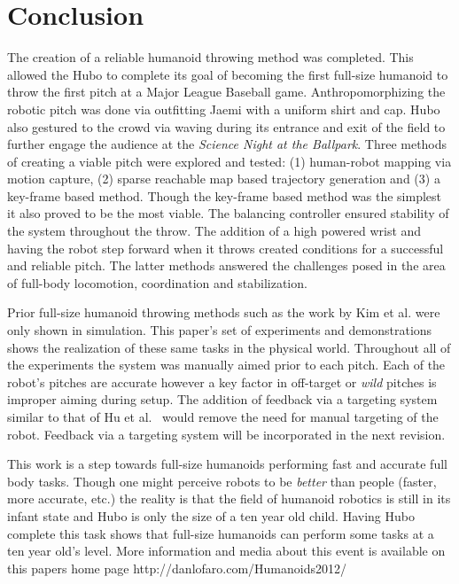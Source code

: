 \section{Conclusion}\label{sec:conclusion}
The creation of a reliable humanoid throwing method was completed. 
This allowed the Hubo to complete its goal of becoming the first full-size humanoid to throw the first pitch at a Major League Baseball game.
Anthropomorphizing the robotic pitch was done via outfitting Jaemi with a uniform shirt and cap.
Hubo also gestured to the crowd via waving during its entrance and exit of the field to further engage the audience at the \textit{Science Night at the Ballpark}.
Three methods of creating a viable pitch were explored and tested: (1) human-robot mapping via motion capture, (2) sparse reachable map based trajectory generation and (3) a key-frame based method.  
Though the key-frame based method was the simplest it also proved to be the most viable.  
The balancing controller ensured stability of the system throughout the throw.  
The addition of a high powered wrist and having the robot step forward when it throws created conditions for a successful and reliable pitch.
The latter methods answered the challenges posed in the area of full-body locomotion, coordination and stabilization.

Prior full-size humanoid throwing methods such as the work by Kim et al. \cite{5686315,JooH2011438} were only shown in simulation.
This paper's set of experiments and demonstrations shows the realization of these same tasks in the physical world.
Throughout all of the experiments the system was manually aimed prior to each pitch.
Each of the robot's pitches are accurate however a key factor in off-target or \textit{wild} pitches is improper aiming during setup.
The addition of feedback via a targeting system similar to that of Hu et al.~\cite{5649335} would remove the need for manual targeting of the robot.
Feedback via a targeting system will be incorporated in the next revision.

This work is a step towards full-size humanoids performing fast and accurate full body tasks.
Though one might perceive robots to be \textit{better} than people (faster, more accurate, etc.) the reality is that the field of humanoid robotics is still in its infant state and Hubo is only the size of a ten year old child.
Having Hubo complete this task shows that full-size humanoids can perform some tasks at a ten year old's level.
More information and media about this event is available on this papers home page http://danlofaro.com/Humanoids2012/













